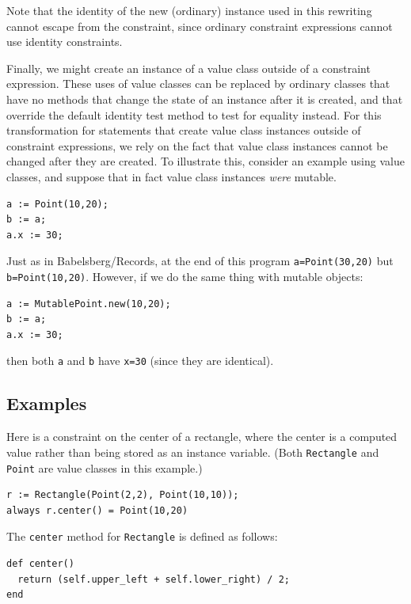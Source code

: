 \documentclass{article}
\begin{document}
Note that the identity of the new (ordinary) instance used in this
rewriting cannot escape from the constraint, since ordinary constraint
expressions cannot use identity constraints.

Finally, we might create an instance of a value class outside of a
constraint expression.  These uses of value classes can be replaced by
ordinary classes that have no methods that change the state of an
instance after it is created, and that override the default identity
test method to test for equality instead.  For this transformation for
statements that create value class instances outside of constraint
expressions, we rely on the fact that value class instances cannot be
changed after they are created.  To illustrate this, consider an
example using value classes, and suppose that in fact value class
instances \emph{were} mutable.

\begin{verbatim}
a := Point(10,20);
b := a;
a.x := 30;
\end{verbatim}

Just as in Babelsberg/Records, at the end of this program
\verb|a=Point(30,20)| but \verb|b=Point(10,20)|.  However, if we do the same
thing with mutable objects:

\begin{verbatim}
a := MutablePoint.new(10,20);
b := a;
a.x := 30;
\end{verbatim}

then both \verb|a| and \verb|b| have \verb|x=30| (since they are identical).

\subsection{Examples}

Here is a constraint on the center of a rectangle, where the center is
a computed value rather than being stored as an instance variable.
(Both \verb!Rectangle! and \verb!Point! are value classes in this
example.)

\begin{verbatim}
r := Rectangle(Point(2,2), Point(10,10));
always r.center() = Point(10,20)
\end{verbatim}

The \verb|center| method for \verb|Rectangle| is defined as follows:
\begin{verbatim}
def center()
  return (self.upper_left + self.lower_right) / 2;
end
\end{verbatim}
\end{document}
